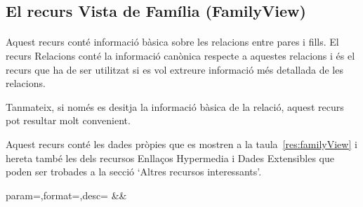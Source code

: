 \subsection{El recurs Vista de Família (FamilyView)}

    \paragraph{}
    Aquest recurs conté informació bàsica sobre les relacions entre pares i fills. El recurs Relacions conté la informació canònica respecte a aquestes relacions i és el recurs que ha de ser utilitzat si es vol extreure informació més detallada de les relacions.

    Tanmateix, si només es desitja la informació bàsica de la relació, aquest recurs pot resultar molt convenient.

    Aquest recurs conté les dades pròpies que es mostren a la taula~\ref{res:familyView} i hereta també les dels recursos Enllaços Hypermedia i Dades Extensibles que poden ser trobades a la secció `Altres recursos interessants'.

    \clearpage

    \begin{center}
             {param=\param,format=\format,desc=\desc}
             {\param&\format&\desc}
     \end{center}
